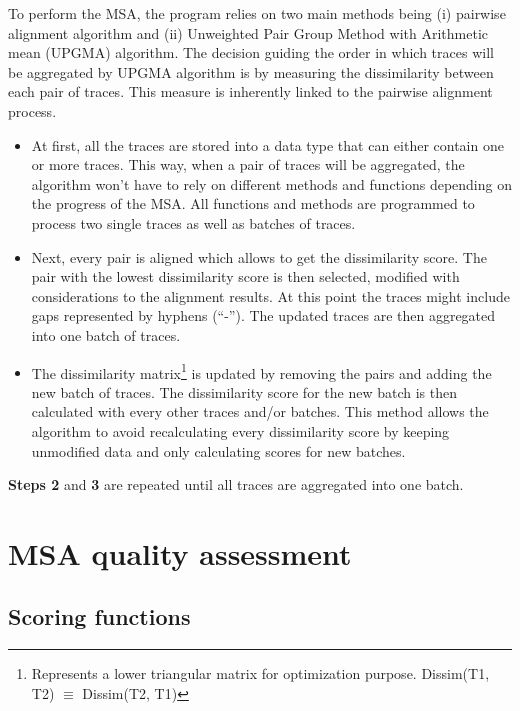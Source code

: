 \documentclass[12pt,a4paper]{article}
\begin{document}
To perform the MSA, the program relies on two main methods being (i) pairwise alignment algorithm and (ii) Unweighted Pair Group Method with Arithmetic mean (UPGMA) algorithm. The decision guiding the order in which traces will be aggregated by UPGMA algorithm is by measuring the dissimilarity between each pair of traces. This measure is inherently linked to the pairwise alignment process.

\begin{itemize}
\item[\textbf{Step 1}] At first, all the traces are stored into a data type that can either contain one or more traces. This way, when a pair of traces will be aggregated, the algorithm won't have to rely on different methods and functions depending on the progress of the MSA. All functions and methods are programmed to process two single traces as well as batches of traces.

\item[\textbf{Step 2}] Next, every pair is aligned which allows to get the dissimilarity score. The pair with the lowest dissimilarity score is then selected, modified with considerations to the alignment results. At this point the traces might include gaps represented by hyphens (``-''). The updated traces are then aggregated into one batch of traces.

\item[\textbf{Step 3}] The dissimilarity matrix\footnote{Represents a lower triangular matrix for optimization purpose. Dissim(T1, T2) $\equiv$ Dissim(T2, T1)} is updated by removing the pairs and adding the new batch of traces. The dissimilarity score for the new batch is then calculated with every other traces and/or batches. This method allows the algorithm to avoid recalculating every dissimilarity score by keeping unmodified data and only calculating scores for new batches.
\end{itemize}

\textbf{Steps 2} and \textbf{3} are repeated until all traces are aggregated into one batch.

\section{MSA quality assessment}

\subsection{Scoring functions}
\end{document}
